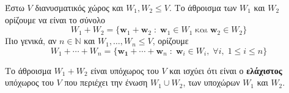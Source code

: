 \begin{dfn}
    Έστω $V$ διανυσματικός χώρος και $ W_{1}, W_{2} \leq V $. Το 
    \textcolor{Col2}{άθροισμα} των $ W_{1} $ και $ W_{2} $ ορίζουμε να είναι το σύνολο 
    \[
        W_{1}+W_{2} = \{ \mathbf{w}_{1}+ \mathbf{w}_{2} \; : \; \mathbf{w}_{1} 
        \in W_{1} \; \text{και} \; \mathbf{w}_{2} \in W_{2} \} 
    \]
    Πιο γενικά, αν $ n \in \mathbb{N} $ και $ W_{1}, \ldots, W_{n} \leq V $, ορίζουμε
    \[
        W_{1}+\cdots +W_{n} = \{ \mathbf{w_{1}}+\cdots + \mathbf{w}_{n} \; : \; 
        \mathbf{w}_{i} \in W_{i}, \; \forall i, \; 1 \leq i \leq n \} 
    \] 
\end{dfn}

\begin{prop}
    Το άθροισμα $ W_{1}+W_{2} $ είναι υπόχωρος του $V$ και ισχύει ότι είναι ο 
    \textbf{ελάχιστος} υπόχωρος του $V$ που περιέχει την ένωση 
    $ W_{1} \cup W_{2} $, των υποχώρων $ W_{1} $ και $ W_{2} $. 
\end{prop}

